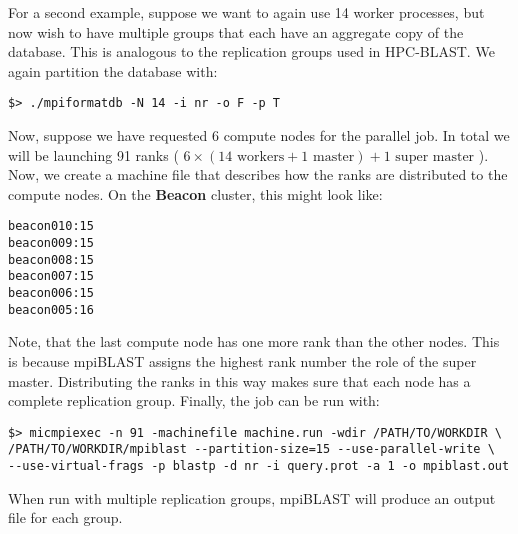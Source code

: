\documentclass[10pt]{article}
\newcommand{\beac}{\textbf{Beacon }}
\begin{document}
For a second example, suppose we want to again use 14 worker processes, but now wish to have multiple groups that each have an aggregate copy of the database.  This is analogous to the replication groups used in HPC-BLAST.  We again partition the database
with:
\begin{verbatim}
$> ./mpiformatdb -N 14 -i nr -o F -p T
\end{verbatim}
\noindent Now, suppose we have requested 6 compute nodes for the parallel job.  In total we will be launching 91 ranks ( \(6 \times (14\,\, \mbox{workers} + 1\,\, \mbox{master} ) + 1\,\, \mbox{super master}\) ).  Now, we create a machine file that describes how the ranks
are distributed to the compute nodes.  On the \beac cluster, this might look like:
\begin{verbatim}
beacon010:15
beacon009:15
beacon008:15
beacon007:15
beacon006:15
beacon005:16
\end{verbatim}
\noindent Note, that the last compute node has one more rank than the other nodes.  This is because mpiBLAST assigns the highest rank number the role of the super master.  Distributing the ranks in this way makes sure that each node has a complete replication group.
Finally, the job can be run with:
\begin{verbatim}
$> micmpiexec -n 91 -machinefile machine.run -wdir /PATH/TO/WORKDIR \
/PATH/TO/WORKDIR/mpiblast --partition-size=15 --use-parallel-write \
--use-virtual-frags -p blastp -d nr -i query.prot -a 1 -o mpiblast.out
\end{verbatim}
\noindent When run with multiple replication groups, mpiBLAST will produce an output file for each group.


\clearpage
\end{document}
